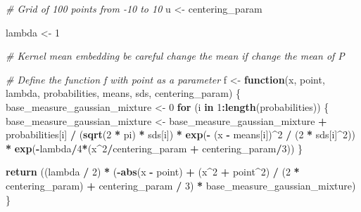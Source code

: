 \documentclass[
]{article}
\newenvironment{Shaded}{\begin{snugshade}}{\end{snugshade}}
\newcommand{\CommentTok}[1]{\textcolor[rgb]{0.56,0.35,0.01}{\textit{#1}}}
\newcommand{\ControlFlowTok}[1]{\textcolor[rgb]{0.13,0.29,0.53}{\textbf{#1}}}
\newcommand{\DecValTok}[1]{\textcolor[rgb]{0.00,0.00,0.81}{#1}}
\newcommand{\FunctionTok}[1]{\textcolor[rgb]{0.13,0.29,0.53}{\textbf{#1}}}
\newcommand{\NormalTok}[1]{#1}
\newcommand{\OtherTok}[1]{\textcolor[rgb]{0.56,0.35,0.01}{#1}}
\newcommand{\SpecialCharTok}[1]{\textcolor[rgb]{0.81,0.36,0.00}{\textbf{#1}}}
\begin{document}
\begin{Shaded}
\begin{Highlighting}[]
\CommentTok{\# Grid of 100 points from {-}10 to 10}
\NormalTok{u }\OtherTok{\textless{}{-}}\NormalTok{ centering\_param}


\NormalTok{lambda }\OtherTok{\textless{}{-}} \DecValTok{1}

\CommentTok{\# Kernel mean embedding be careful change the mean if change the mean of P}


\CommentTok{\# Define the function f with point as a parameter}
\NormalTok{f }\OtherTok{\textless{}{-}} \ControlFlowTok{function}\NormalTok{(x, point, lambda, probabilities, means, sds, centering\_param) \{}
\NormalTok{  base\_measure\_gaussian\_mixture }\OtherTok{\textless{}{-}} \DecValTok{0}
  \ControlFlowTok{for}\NormalTok{ (i }\ControlFlowTok{in} \DecValTok{1}\SpecialCharTok{:}\FunctionTok{length}\NormalTok{(probabilities)) \{}
\NormalTok{    base\_measure\_gaussian\_mixture }\OtherTok{\textless{}{-}}\NormalTok{ base\_measure\_gaussian\_mixture }\SpecialCharTok{+}
\NormalTok{      probabilities[i] }\SpecialCharTok{/}\NormalTok{ (}\FunctionTok{sqrt}\NormalTok{(}\DecValTok{2} \SpecialCharTok{*}\NormalTok{ pi) }\SpecialCharTok{*}\NormalTok{ sds[i]) }\SpecialCharTok{*} \FunctionTok{exp}\NormalTok{(}\SpecialCharTok{{-}}\NormalTok{ (x }\SpecialCharTok{{-}}\NormalTok{ means[i])}\SpecialCharTok{\^{}}\DecValTok{2} \SpecialCharTok{/}\NormalTok{ (}\DecValTok{2} \SpecialCharTok{*}\NormalTok{ sds[i]}\SpecialCharTok{\^{}}\DecValTok{2}\NormalTok{)) }\SpecialCharTok{*}
      \FunctionTok{exp}\NormalTok{(}\SpecialCharTok{{-}}\NormalTok{lambda}\SpecialCharTok{/}\DecValTok{4}\SpecialCharTok{*}\NormalTok{(x}\SpecialCharTok{\^{}}\DecValTok{2}\SpecialCharTok{/}\NormalTok{centering\_param }\SpecialCharTok{+}\NormalTok{ centering\_param}\SpecialCharTok{/}\DecValTok{3}\NormalTok{))}
\NormalTok{  \}}

  \FunctionTok{return}\NormalTok{ ((lambda }\SpecialCharTok{/} \DecValTok{2}\NormalTok{) }\SpecialCharTok{*}\NormalTok{ (}\SpecialCharTok{{-}}\FunctionTok{abs}\NormalTok{(x }\SpecialCharTok{{-}}\NormalTok{ point) }\SpecialCharTok{+}\NormalTok{ (x}\SpecialCharTok{\^{}}\DecValTok{2} \SpecialCharTok{+}\NormalTok{ point}\SpecialCharTok{\^{}}\DecValTok{2}\NormalTok{) }\SpecialCharTok{/}\NormalTok{ (}\DecValTok{2} \SpecialCharTok{*}\NormalTok{ centering\_param) }\SpecialCharTok{+}\NormalTok{ centering\_param }\SpecialCharTok{/} \DecValTok{3}\NormalTok{) }\SpecialCharTok{*}\NormalTok{ base\_measure\_gaussian\_mixture)}
\NormalTok{\}}




\end{Highlighting}
\end{Shaded}
\end{document}
